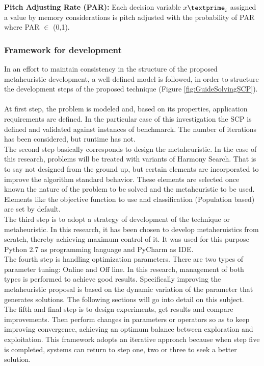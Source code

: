 \textbf{Pitch Adjusting Rate (PAR):} 
Each decision variable ${x\textprime}_i$ assigned a value by memory considerations is pitch adjusted with the probability of PAR where PAR $\in$ (0,1).

\subsubsection{Framework for development}
In an effort to maintain consistency in the structure of the proposed metaheuristic development, a well-defined model is followed, in order to structure the development steps of the proposed technique (Figure \ref{fig:GuideSolvingSCP}). \\
~\\
At first step, the problem is modeled and, based on its properties, application requirements are defined. In the particular case of this investigation the SCP is defined and validated against instances of benchmarck. The number of iterations has been considered, but runtime has not.\\

The second step basically corresponds to design the metaheuristic. In the case of this research, problems will be treated with variants of Harmony Search. That is to say not designed from the ground up, but certain elements are incorporated to improve the algorithm standard behavior. These elements are selected once known the nature of the problem to be solved and the metaheuristic to be used. Elements like the objective function to use and classification (Population based) are set by default.\\

The third step is to adopt a strategy of development of the technique or metaheuristic. In this research, it has been chosen to develop metaheruistics from scratch, thereby achieving maximum control of it. It was used for this purpose Python 2.7 as programming language and  PyCharm as IDE.\\

The fourth step is handling optimization parameters. There are two types of parameter tuning: Online and Off line. In this research, management of both types is performed to achieve good results. Specifically improving the metaheuristic proposal is based on the dynamic variation of the parameter that generates solutions. The following sections will go into detail on this subject.\\

The fifth and final step is to design experiments, get results and compare improvements. Then perform changes in parameters or operators so as to keep improving convergence, achieving an optimum balance between exploration and exploitation. This framework adopts an iterative approach because when step five is completed, systems can return to step one, two or three to seek a better solution.